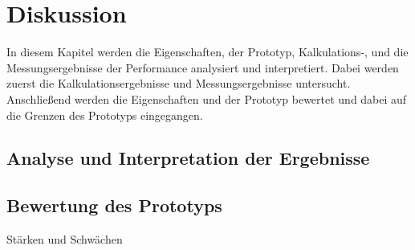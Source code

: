 \chapter{Diskussion}

In diesem Kapitel werden die Eigenschaften, der Prototyp, Kalkulations-, und die Messungsergebnisse der Performance analysiert und interpretiert. Dabei werden zuerst die Kalkulationsergebnisse und Messungsergebnisse untersucht. Anschließend werden die Eigenschaften und der Prototyp bewertet und dabei auf die Grenzen des Prototyps eingegangen.
  
\section{Analyse und Interpretation der Ergebnisse}



\section{Bewertung des Prototyps}

Stärken und Schwächen
